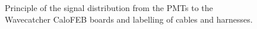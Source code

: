 \documentclass[12pt,a4paper]{article}
\newcommand{\pdftextimgpath}{./pdftex_t}
\begin{document}
\begin{figure}[h!]
  \begin{center}
    \scalebox{0.75}{}
  \end{center}
  \caption{Principle of the signal distribution from the PMTs to the
    Wavecatcher CaloFEB boards and labelling of cables and harnesses.}
  \label{fig:calosignal:principle:1}
\end{figure}

\clearpage



\end{document}
